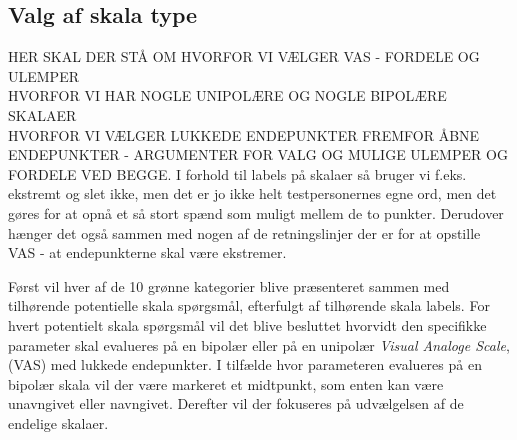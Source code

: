 \subsection{Valg af skala type}
\label{ParametreSkalaType}
%
%
HER SKAL DER STÅ OM HVORFOR VI VÆLGER VAS - FORDELE OG ULEMPER\\
HVORFOR VI HAR NOGLE UNIPOLÆRE OG NOGLE BIPOLÆRE SKALAER\\
HVORFOR VI VÆLGER LUKKEDE ENDEPUNKTER FREMFOR ÅBNE ENDEPUNKTER - ARGUMENTER FOR VALG OG MULIGE ULEMPER OG FORDELE VED BEGGE.\blankline
%
I forhold til labels på skalaer så bruger vi f.eks. ekstremt og slet ikke, men det er jo ikke helt testpersonernes egne ord, men det gøres for at opnå et så stort spænd som muligt mellem de to punkter. Derudover hænger det også sammen med nogen af de retningslinjer der er for at opstille VAS - at endepunkterne skal være ekstremer. 

Først vil hver af de 10 grønne kategorier blive præsenteret sammen med tilhørende potentielle skala spørgsmål, efterfulgt af tilhørende skala labels. For hvert potentielt skala spørgsmål vil det blive besluttet hvorvidt den specifikke parameter skal evalueres på en bipolær eller på en unipolær \textit{Visual Analoge Scale}, (VAS) med lukkede endepunkter. I tilfælde hvor parameteren evalueres på en bipolær skala vil der være markeret et midtpunkt, som enten kan være unavngivet eller navngivet. Derefter vil der fokuseres på udvælgelsen af de endelige skalaer.
\newpage 
%
